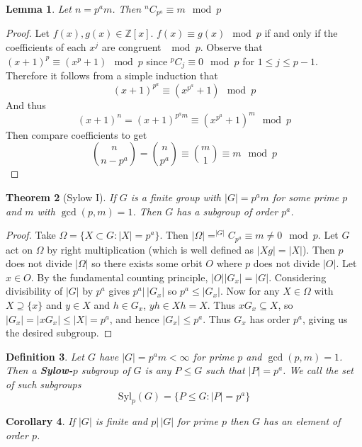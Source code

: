 \documentclass[a4paper,10pt]{article}
\newcommand{\ZZ}{\mathbb{Z}}
\newtheorem{thm}{Theorem}
\newtheorem{Def}[thm]{Definition}
\newtheorem{Cor}[thm]{Corollary}
\newtheorem{Lem}[thm]{Lemma}
\begin{document}
\begin{Lem}
Let $n = p^a m$. Then $^nC_{p^a} \equiv m \mod p$
\end{Lem}

\begin{proof}
Let $f(x), g(x) \in \ZZ[x]$. $f(x) \equiv g(x) \mod p$ if and only if the coefficients of each $x^j$ are congruent $\mod p$. Observe that $(x + 1)^p \equiv (x^p + 1) \mod p$ since $^pC_j \equiv 0 \mod p$ for $1 \leq j \leq p-1$. Therefore it follows from a simple induction that 
\[ (x+ 1)^{p^a} \equiv (x^{p^a} + 1) \mod p \]
And thus
\[ (x+1)^n = (x+1)^{p^a m} \equiv (x^{p^a} + 1)^m \mod p \]
Then compare coefficients to get
\[ \binom{n}{n - p^a} = \binom{n}{p^a} \equiv \binom{m}{1} \equiv m \mod p \]
\end{proof}

\begin{thm}[Sylow I]
If $G$ is a finite group with $|G| = p^a m$ for some prime $p$ and $m$ with $\gcd(p,m)= 1$. Then $G$ has a subgroup of order $p^a$.
\end{thm}

\begin{proof}
Take $\Omega = \{ X \subset G : |X| = p^a \}$. Then $|\Omega| = ^{|G|}C_{p^a} \equiv m \neq 0 \mod p$. Let $G$ act on $\Omega$ by right multiplication (which is well defined as $|Xg| = |X|$). Then $p$ does not divide $|\Omega|$ so there exists some orbit $O$ where $p$ does not divide $|O|$. Let $x \in O$. By the fundamental counting principle, $|O| |G_x| = |G|$. Considering divisibility of $|G|$ by $p^a$ gives $p^a \big| \, |G_x|$ so $p^a \leq |G_x|$. Now for any $X \in \Omega$ with $X \supseteq \{x\}$ and $y \in X$ and $h \in G_x$, $yh \in Xh = X$. Thus $xG_x \subseteq X$, so $|G_x| = |xG_x| \leq |X| = p^a$, and hence $|G_x| \leq p^a$. Thus $G_x$ has order $p^a$, giving us the desired subgroup.    
\end{proof}

\begin{Def}
Let $G$ have $|G| = p^a m < \infty$ for prime $p$ and $\gcd(p,m) = 1$. Then a \textbf{Sylow-$p$} subgroup of $G$ is any $P \leq G$ such that $|P| = p^a$. We call the set of such subgroups
\[ \text{Syl}_p(G) = \{ P \leq G : |P| = p^a \} \]
\end{Def}


\begin{Cor}
If $|G|$ is finite and $p \big| \, |G|$ for prime $p$ then $G$ has an element of order $p$. 
\end{Cor}
\end{document}
